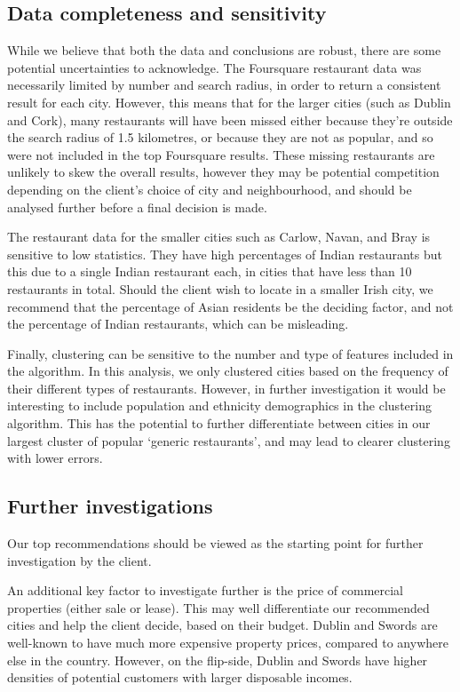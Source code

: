 \documentclass[a4paper,11pt]{article}
\begin{document}
\subsection{Data completeness and sensitivity} 
While we believe that both the data and conclusions are robust, there are some potential uncertainties to acknowledge. The Foursquare restaurant data was necessarily limited by number and search radius, in order to return a consistent result for each city. However, this means that for the larger cities (such as Dublin and Cork), many restaurants will have been missed either because they're outside the search radius of 1.5 kilometres, or because they are not as popular, and so were not included in the top Foursquare results. These missing restaurants are unlikely to skew the overall results, however they may be potential competition depending on the client's choice of city and neighbourhood, and should be analysed further before a final decision is made.

The restaurant data for the smaller cities such as Carlow, Navan, and Bray is sensitive to low statistics. They have high percentages of Indian restaurants but this due to a single Indian restaurant each, in cities that have less than 10 restaurants in total. Should the client wish to locate in a smaller Irish city, we recommend that the percentage of Asian residents be the deciding factor, and not the percentage of Indian restaurants, which can be misleading.

Finally, clustering can be sensitive to the number and type of features included in the algorithm. In this analysis, we only clustered cities based on the frequency of their different types of restaurants. However, in further investigation it would be interesting to include population and ethnicity demographics in the clustering algorithm. This has the potential to further differentiate between cities in our largest cluster of popular `generic restaurants', and may lead to clearer clustering with lower errors. 

\subsection{Further investigations}
Our top recommendations should be viewed as the starting point for further investigation by the client.

An additional key factor to investigate further is the price of commercial properties (either sale or lease). This may well differentiate our recommended cities and help the client decide, based on their budget. Dublin and Swords are well-known to have much more expensive property prices, compared to anywhere else in the country. However, on the flip-side, Dublin and Swords have higher densities of potential customers with larger disposable incomes.
\end{document}
